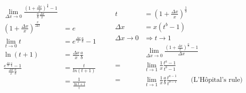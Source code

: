 \documentclass{article}
\begin{document}
  \[
    \begin{aligned}
      \lim_{\Delta{x} \to 0} \frac{\left( 1 + \frac{\Delta{x}}{x} \right)^{\frac{a}{b}} - 1} {\frac{a}{b} \frac{\Delta{x}}{x}} \\
      \left( 1 + \frac{\Delta{x}}{x} \right)^{\frac{x}{\Delta{x}}} &= e \\
      \lim_{t \to 0} t &= e^{\frac{\Delta{x}}{x} \frac{a}{b}} - 1\\
      \ln \left( t + 1 \right) &= \frac{\Delta{x}}{x} \frac{a}{b} \\
      \frac{e^{\frac{\Delta{x}}{x} \frac{a}{b}} - 1}{\frac{\Delta{x}}{x} \frac{a}{b}} &=
      \frac{t}{ln \left( t + 1 \right)} \\
      &= \frac{1}{\frac{\ln t + 1}{t}}
    \end{aligned}
    \qquad
    \begin{aligned}
      t &= \left(1 + \frac{\Delta{x}}{x} \right)^{\frac{1}{b}} \\
      \Delta{x} &= x \left( t^{b} - 1 \right) \\
      \Delta{x} \to 0 &\Rightarrow t \to 1 \\
      &\lim_{\Delta{x} \to 0} \frac{ \left( 1 + \frac{\Delta{x}}{x} \right)^{\frac{a}{b}} - 1}{\Delta{x}} \\
      = &\lim_{t \to 1} \frac{1}{x} \frac{t^{a} - 1}{t^{b} - 1} \\
      = &\lim_{t \to 1} \frac{1}{x} \frac{a}{b} \frac{t^{a -1}}{t^{b - 1}} \qquad \text{(L'Hôpital's rule)} %
    \end{aligned}
  \]
\end{document}
